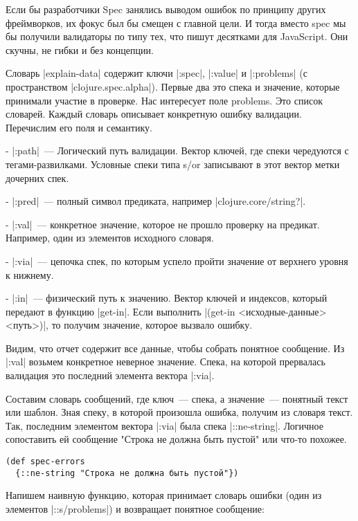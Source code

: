 Если бы разработчики Spec занялись выводом ошибок по принципу других
фреймворков, их фокус был бы смещен с главной цели. И тогда вместо spec мы бы
получили валидаторы по типу тех, что пишут десятками для JavaScript. Они скучны,
не гибки и без концепции.

Словарь \spverb|explain-data| содержит ключи \spverb|:spec|, \spverb|:value| и \spverb|:problems| (с
пространством \spverb|clojure.spec.alpha|). Первые два это спека и значение, которые
принимали участие в проверке. Нас интересует поле problems. Это список
словарей. Каждый словарь описывает конкретную ошибку валидации. Перечислим его
поля и семантику.

- \spverb|:path|~--- Логический путь валидации. Вектор ключей, где спеки чередуются с
  тегами-развилками. Условные спеки типа s/or записывают в этот вектор метки
  дочерних спек.

- \spverb|:pred|~--- полный символ предиката, например \spverb|clojure.core/string?|.

- \spverb|:val|~--- конкретное значение, которое не прошло проверку на
  предикат. Например, один из элементов исходного словаря.

- \spverb|:via|~--- цепочка спек, по которым успело пройти значение от верхнего уровня к
  нижнему.

- \spverb|:in|~--- физический путь к значению. Вектор ключей и индексов, который передают
  в функцию \spverb|get-in|. Если выполнить \spverb|(get-in <исходные-данные> <путь>)|, то
  получим значение, которое вызвало ошибку.

Видим, что отчет содержит все данные, чтобы собрать понятное сообщение. Из
\spverb|:val| возьмем конкретное неверное значение. Спека, на которой прервалась
валидация это последний элемента вектора \spverb|:via|.

Составим словарь сообщений, где ключ~--- спека, а значение~--- понятный текст или
шаблон. Зная спеку, в которой произошла ошибка, получим из словаря текст. Так,
последним элементом вектора \spverb|:via| была спека \spverb|::ne-string|. Логичное
сопоставить ей сообщение "Строка не должна быть пустой" или что-то похожее.

\begin{verbatim}
(def spec-errors
  {::ne-string "Строка не должна быть пустой"})
\end{verbatim}

Напишем наивную функцию, которая принимает словарь ошибки (один из элементов
\spverb|::s/problems|) и возвращает понятное сообщение:

